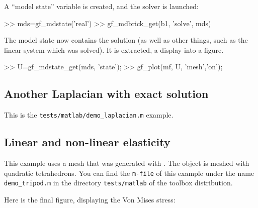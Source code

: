 A ``model state'' variable is created, and the solver is launched:
\begin{matlab}
>> mds=gf_mdstate('real')
>> gf_mdbrick_get(b1, 'solve', mds)
\end{matlab}

The model state now contains the solution (as well as other things, such as the linear system which was solved). It is extracted, a display into a \mlab figure.
\begin{matlab}
>> U=gf_mdstate_get(mds, 'state');
>> gf_plot(mf, U, 'mesh','on');
\end{matlab}

\subsection{Another Laplacian with exact solution}
This is the \texttt{tests/matlab/demo_laplacian.m} example.



\subsection{Linear and non-linear elasticity}
This example  uses a mesh that was generated with
. The object is meshed with
quadratic tetrahedrons. You can find the \texttt{m-file} of this example under
the name \texttt{demo_tripod.m} in the directory \texttt{tests/matlab} of the
toolbox distribution.



Here is the final figure, displaying the Von Mises stress:

\begin{center}
\end{center}

